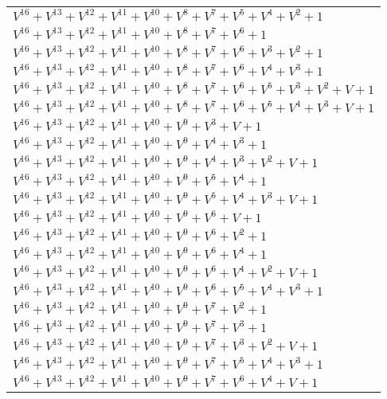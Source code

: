 \documentclass[12pt]{article}
\begin{document}
\begin{adjustwidth}{-4cm}{}
\begin{center}
\begin{longtable}{|l|}
$V^{16}  +V^{13}  +V^{12}  +V^{11}  +V^{10}  +V^{8}  +V^{7}  +V^{5}  +V^{4}  +V^{2}  + 1$ \\
$V^{16}  +V^{13}  +V^{12}  +V^{11}  +V^{10}  +V^{8}  +V^{7}  +V^{6}  + 1$ \\
$V^{16}  +V^{13}  +V^{12}  +V^{11}  +V^{10}  +V^{8}  +V^{7}  +V^{6}  +V^{3}  +V^{2}  + 1$ \\
$V^{16}  +V^{13}  +V^{12}  +V^{11}  +V^{10}  +V^{8}  +V^{7}  +V^{6}  +V^{4}  +V^{3}  + 1$ \\
$V^{16}  +V^{13}  +V^{12}  +V^{11}  +V^{10}  +V^{8}  +V^{7}  +V^{6}  +V^{5}  +V^{3}  +V^{2}  + V + 1$ \\
$V^{16}  +V^{13}  +V^{12}  +V^{11}  +V^{10}  +V^{8}  +V^{7}  +V^{6}  +V^{5}  +V^{4}  +V^{3}  + V + 1$ \\
$V^{16}  +V^{13}  +V^{12}  +V^{11}  +V^{10}  +V^{9}  +V^{3}  + V + 1$ \\
$V^{16}  +V^{13}  +V^{12}  +V^{11}  +V^{10}  +V^{9}  +V^{4}  +V^{3}  + 1$ \\
$V^{16}  +V^{13}  +V^{12}  +V^{11}  +V^{10}  +V^{9}  +V^{4}  +V^{3}  +V^{2}  + V + 1$ \\
$V^{16}  +V^{13}  +V^{12}  +V^{11}  +V^{10}  +V^{9}  +V^{5}  +V^{4}  + 1$ \\
$V^{16}  +V^{13}  +V^{12}  +V^{11}  +V^{10}  +V^{9}  +V^{5}  +V^{4}  +V^{3}  + V + 1$ \\
$V^{16}  +V^{13}  +V^{12}  +V^{11}  +V^{10}  +V^{9}  +V^{6}  + V + 1$ \\
$V^{16}  +V^{13}  +V^{12}  +V^{11}  +V^{10}  +V^{9}  +V^{6}  +V^{2}  + 1$ \\
$V^{16}  +V^{13}  +V^{12}  +V^{11}  +V^{10}  +V^{9}  +V^{6}  +V^{4}  + 1$ \\
$V^{16}  +V^{13}  +V^{12}  +V^{11}  +V^{10}  +V^{9}  +V^{6}  +V^{4}  +V^{2}  + V + 1$ \\
$V^{16}  +V^{13}  +V^{12}  +V^{11}  +V^{10}  +V^{9}  +V^{6}  +V^{5}  +V^{4}  +V^{3}  + 1$ \\
$V^{16}  +V^{13}  +V^{12}  +V^{11}  +V^{10}  +V^{9}  +V^{7}  +V^{2}  + 1$ \\
$V^{16}  +V^{13}  +V^{12}  +V^{11}  +V^{10}  +V^{9}  +V^{7}  +V^{3}  + 1$ \\
$V^{16}  +V^{13}  +V^{12}  +V^{11}  +V^{10}  +V^{9}  +V^{7}  +V^{3}  +V^{2}  + V + 1$ \\
$V^{16}  +V^{13}  +V^{12}  +V^{11}  +V^{10}  +V^{9}  +V^{7}  +V^{5}  +V^{4}  +V^{3}  + 1$ \\
$V^{16}  +V^{13}  +V^{12}  +V^{11}  +V^{10}  +V^{9}  +V^{7}  +V^{6}  +V^{4}  + V + 1$ \\

\end{longtable}
\end{center}
\end{adjustwidth}
\end{document}

